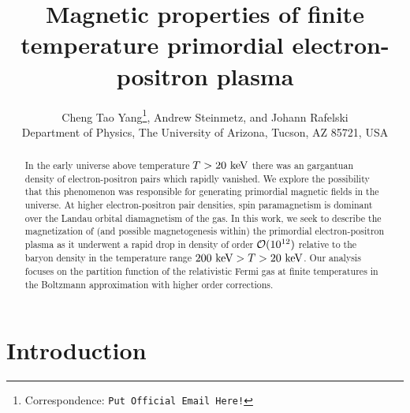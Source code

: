 \documentclass[a4paper]{article}
\title{\boldmath Magnetic properties of finite temperature primordial electron-positron plasma}
\author{Cheng Tao Yang\orc{\orcB}\thanks{Correspondence: \texttt{Put Official Email Here!}}, Andrew Steinmetz\orc{\orcC}, and Johann Rafelski\orc{\orcA}\\ Department of Physics, The University of Arizona, Tucson, AZ 85721, USA}
\begin{document}
\maketitle

\begin{abstract}
    In the early universe above temperature $T>20\text{ keV}$ there was an gargantuan density of electron-positron pairs which rapidly vanished. We explore the possibility that this phenomenon was responsible for generating primordial magnetic fields in the universe. At higher electron-positron pair densities, spin paramagnetism is dominant over the Landau orbital diamagnetism of the gas. In this work, we seek to describe the magnetization of (and possible magnetogenesis within) the primordial electron-positron plasma as it underwent a rapid drop in density of order ${\cal O}(10^{12})$ relative to the baryon density in the temperature range $200\text{ keV}>T>20\text{ keV}$. Our analysis focuses on the partition function of the relativistic Fermi gas at finite temperatures in the Boltzmann approximation with higher order corrections.
\end{abstract}


\section{Introduction}\label{sec:Introduction}
\end{document}
